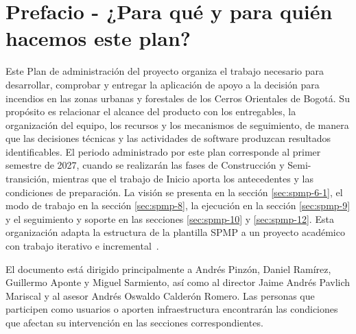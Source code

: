 \clearpage
\section{Prefacio - ¿Para qué y para quién hacemos este plan?}\label{sec:spmp-2}
Este Plan de administración del proyecto organiza el trabajo necesario para desarrollar, comprobar y entregar la aplicación de apoyo a la decisión para incendios en las zonas urbanas y forestales de los Cerros Orientales de Bogotá. Su propósito es relacionar el alcance del producto con los entregables, la organización del equipo, los recursos y los mecanismos de seguimiento, de manera que las decisiones técnicas y las actividades de software produzcan resultados identificables. El periodo administrado por este plan corresponde al primer semestre de 2027, cuando se realizarán las fases de Construcción y Semi-transición, mientras que el trabajo de Inicio aporta los antecedentes y las condiciones de preparación. La visión se presenta en la sección \ref{sec:spmp-6-1}, el modo de trabajo en la sección \ref{sec:spmp-8}, la ejecución en la sección \ref{sec:spmp-9} y el seguimiento y soporte en las secciones \ref{sec:spmp-10} y \ref{sec:spmp-12}. Esta organización adapta la estructura de la plantilla SPMP a un proyecto académico con trabajo iterativo e incremental~\cite{plantillaspmp,adaptacion2026}.

El documento está dirigido principalmente a Andrés Pinzón, Daniel Ramírez, Guillermo Aponte y Miguel Sarmiento, así como al director Jaime Andrés Pavlich Mariscal y al asesor Andrés Oswaldo Calderón Romero. Las personas que participen como usuarios o aporten infraestructura encontrarán las condiciones que afectan su intervención en las secciones correspondientes.
